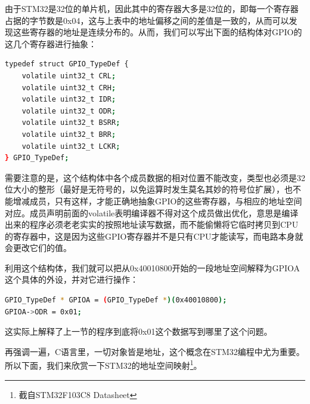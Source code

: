 \par 
由于STM32是32位的单片机，因此其中的寄存器大多是32位的，即每一个寄存器占据的字节数是0x04，这与上表中的地址偏移之间的差值是一致的，从而可以发现这些寄存器的地址是连续分布的。从而，我们可以写出下面的结构体对GPIO的这几个寄存器进行抽象：
\par 
\begin{lstlisting}[language=bash, style=customStyleC, caption=GPIO结构体, label=periphStruct]
typedef struct GPIO_TypeDef {
	volatile uint32_t CRL;
	volatile uint32_t CRH;
	volatile uint32_t IDR;
	volatile uint32_t ODR;
	volatile uint32_t BSRR;
	volatile uint32_t BRR;
	volatile uint32_t LCKR;
} GPIO_TypeDef;
\end{lstlisting}
\par 
需要注意的是，这个结构体中各个成员数据的相对位置不能改变，类型也必须是32位大小的整形（最好是无符号的，以免运算时发生莫名其妙的符号位扩展），也不能增减成员，只有这样，才能正确地抽象GPIO的这些寄存器，与相应的地址空间对应。成员声明前面的volatile表明编译器不得对这个成员做出优化，意思是编译出来的程序必须老老实实的按照地址读写数据，而不能偷懒将它临时拷贝到CPU的寄存器中，这是因为这些GPIO寄存器并不是只有CPU才能读写，而电路本身就会更改它们的值。
\par 
利用这个结构体，我们就可以把从0x40010800开始的一段地址空间解释为GPIOA这个具体的外设，并对它进行操作：
\par 
\begin{lstlisting}[language=bash, style=customStyleC, caption=GPIO结构体应用]
GPIO_TypeDef * GPIOA = (GPIO_TypeDef *)(0x40010800);
GPIOA->ODR = 0x01;
\end{lstlisting}
\par 
这实际上解释了上一节的程序到底将0x01这个数据写到哪里了这个问题。
\par 
再强调一遍，C语言里，一切对象皆是地址，这个概念在STM32编程中尤为重要。所以下面，我们来欣赏一下STM32的地址空间映射\footnote{截自STM32F103C8 Datasheet}。
\par 
